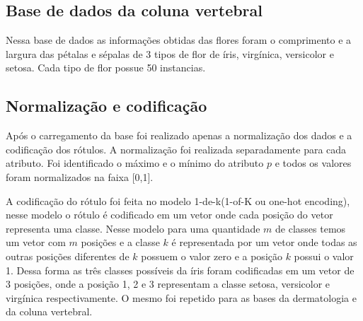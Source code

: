 \documentclass[ 
	article,			%
	11pt,				%
	oneside,			%
	a4paper,			%
	english,			%
	brazil,				%
	]{abntex2}
\begin{document}
\subsection{Base de dados da coluna vertebral}

Nessa base de dados as informações obtidas das flores foram o comprimento e a largura das
pétalas e sépalas de 3 tipos de flor de íris, virgínica, versicolor e setosa.
Cada tipo de flor possue 50 instancias.



\subsection{Normalização e codificação}
\label{ss:normCodf} 
Após o carregamento da base foi realizado apenas a normalização dos dados e a
codificação dos rótulos. A normalização foi realizada separadamente para cada
atributo. Foi identificado o máximo e o mínimo do atributo $p$ e todos os
valores foram normalizados na faixa [0,1].

A codificação do rótulo foi feita no modelo 1-de-k(1-of-K ou one-hot encoding),
nesse modelo o rótulo é codificado em um vetor onde cada posição do
vetor representa uma classe. Nesse modelo para uma quantidade $m$ de classes
temos um vetor com $m$ posições e a classe $k$ é representada por um vetor
onde todas as outras posições diferentes de $k$ possuem o valor zero e a
posição $k$ possui o valor 1. Dessa forma as três classes possíveis da íris
foram codificadas em um vetor de 3 posições, onde a posição 1, 2 e 3
representam a classe setosa, versicolor e virgínica respectivamente. O mesmo foi
repetido para as bases da dermatologia e da coluna vertebral.
\end{document}
